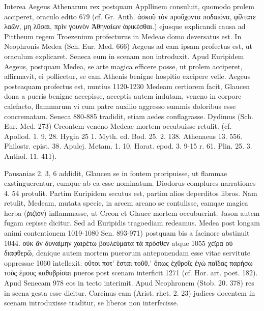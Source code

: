 \documentclass[a4paper, 11pt, oneside, polutonikogreek, german]{article}
\begin{document}
Interea Aegeus Athenarum rex postquam Appllinem consuluit, quomodo prolem acciperet, oraculo edito 679 (cf. Gr. Anth. ἀσκοῦ τὸν προὔχοντα ποδαιόνα, φίλτατε λαῶν, μη λῦσαι, πρὶν γουνὸν Ἀθηναίων ἀφικέσθαι.) ejusque explicandi causa ad Pittheum regem Troezenium profecturus in Medeae domo deversatus est. In Neophronis Medea (Sch. Eur. Med. 666) Aegeus ad eam ipsam profectus est, ut oraculum explicaret. Seneca eum in scenam non introduxit. Apud Euripidem Aegeus, postquam Medea, se arte magica efficere posse, ut prolem acciperet, affirmavit, ei pollicetur, se eam Athenis benigne hospitio excipere velle. Aegeus posteaquam profectus est, nuntius 1120-1230 Medeam certiorem facit, Glaucen dona a pueris benigne accepisse, acceptis autem indutam, veneno in corpore calefacto, flammarum vi cum patre auxilio aggresso summis doloribus esse concrematam. Seneca 880-885 tradidit, etiam aedes conflagrasse. Dydimus (Sch. Eur. Med. 273) Creontem veneno Medeae mortem occubuisse retulit. (cf. Apollod. 1. 9, 28. Hygin 25 1. Myth. ed. Bod. 25. 2. 138. Athenaeus 13. 556. Philostr. epist. 38. Apulej. Metam. 1. 10. Horat. epod. 3. 9-15 r. 61. Plin. 25. 3. Anthol. 11. 411).

Pausanias 2. 3, 6 addidit, Glaucen se in fontem proripuisse, ut flammae exstinguerentur, eumque ab ea esse nominatum. Diodorus complures narrationes 4. 54 protulit. Partim Euripidem secutus est, partim alios deperditos libros. Nam retulit, Medeam, mutata specie, in arcem arcano se contulisse, eamqae magica herba (ῥιζίον) inflammasse, ut Creon et Glauce mortem occubuerint. Jason autem fugam cepisse dicitur. Sed ad Euripidis tragoediam redeamus. Medea post longam animi contentionem 1019-1080 Sen. 893-971) postquam bis a facinore abstinuit 1044. οὐκ ἂν δυναίμην χαιρέτω βουλεύματα τὰ πρόσθεν atque 1055 χεῖρα οὐ διαφθερῶ, denique autem mortem puerorum anteponendam esse vitae servitute oppressae 1060 intellexit: οὔτοι ποτ' ἔσται τοῦθ,' ὅπως ἐχθροῖς ἐγὼ παῖδας παρήσω τοὺς ἐμους καθυβρίσαι pueros post scenam interficit 1271 (cf. Hor. art. poet. 182). Apud Senecam 978 eos in tecto interimit. Apud Neophronem (Stob. 20. 378) res in scena gesta esse dicitur. Carcinus eam (Arist. rhet. 2. 23) judices docentem in scenam introduxisse traditur, se liberos non interfecisse.
\end{document}
